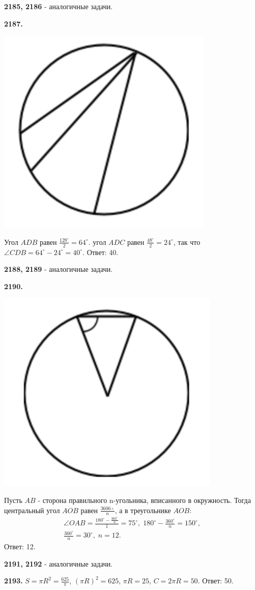 \textbf{2185, 2186} - аналогичные задачи.

\textbf{2187.}

{\centering \includegraphics[width=0.35\linewidth]{Geometry/Content/49.png}
	
}

 Угол $ADB$ равен $\frac{128^\circ}{2}=64^\circ$. угол $ADC$ равен $\frac{48^\circ}{2}=24^\circ$, так что $\angle CDB = 64^\circ - 24^\circ=40^\circ.$ \newline \null \hspace*{\fill} Ответ: 40.

\textbf{2188, 2189} - аналогичные задачи.

\textbf{2190.}

{\centering \includegraphics[width=0.35\linewidth]{Geometry/Content/50.png}
	
}

Пусть $AB$ - сторона правильного n-угольника, вписанного в \newline окружность. Тогда центральный угол $AOB$ равен $\frac{3606\circ}{n}$, а в треугольнике $AOB$:
\begin{gather*}
	\angle OAB = \frac{180^\circ-\frac{360^\circ}{n}}{1}=75^\circ, \; 180^\circ-\frac{360^\circ}{n}=150^\circ, \\ \frac{360^\circ}{n}=30^\circ,\;  n =12.
\end{gather*} \null \hspace*{\fill} Ответ: 12.

\textbf{2191, 2192} - аналогичные задачи.

\textbf{2193.} $S=\pi R^2= \frac{625}{\pi}$, $(\pi R)^2 = 625$, $\pi R = 25$, $C = 2\pi R = 50.$ \newline \null \hspace*{\fill} Ответ: 50.

